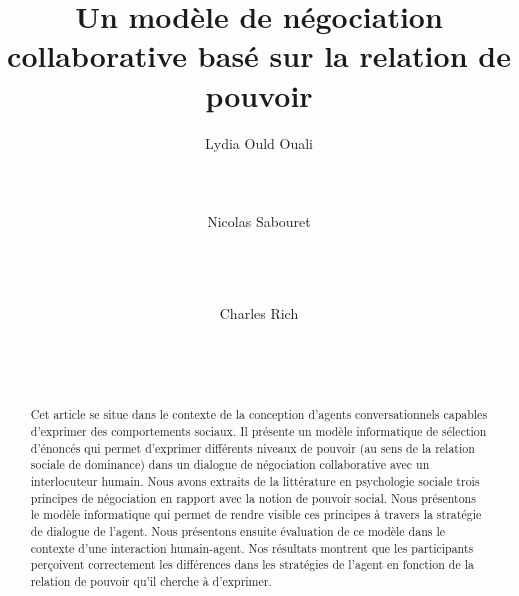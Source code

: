 \documentclass [french]{sig-alternate-05-2015}
\begin{document}
	\title{Un modèle de négociation collaborative basé sur la relation de pouvoir }
	\author{
		\alignauthor Lydia Ould Ouali\\
		\\
		\\
		\\
		\alignauthor Nicolas Sabouret\\
		\\
		\\
		\\
		\and
		\alignauthor Charles Rich\\
		\\
		\\
		\\
	}
	
	\maketitle
	\begin{abstract}
		Cet article se situe dans le contexte de la conception d'agents conversationnels capables d'exprimer des comportements sociaux. Il présente un modèle informatique de sélection d'énoncés qui permet d'exprimer différents niveaux de pouvoir (au sens de la relation sociale de dominance) dans un dialogue de négociation collaborative avec un interlocuteur humain. Nous avons extraits de la littérature en psychologie sociale trois principes de négociation en rapport avec la notion de pouvoir social. Nous présentons le modèle informatique qui permet de rendre visible ces principes à travers la stratégie de dialogue de l'agent. Nous présentons ensuite évaluation de ce modèle dans le contexte d'une interaction humain-agent. Nos résultats montrent que les participants perçoivent correctement les différences dans les stratégies de l'agent en fonction de la relation de pouvoir qu'il cherche à d'exprimer.
	\end{abstract}

\end{document}
